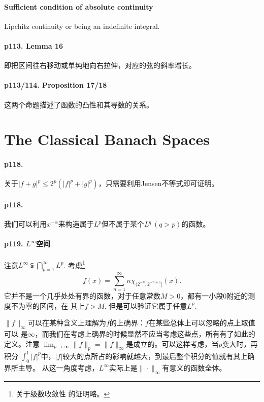   \paragraph{Sufficient condition of absolute continuity}
    Lipchitz continuity or being an indefinite integral.

  \paragraph{p113. Lemma 16}
    即把区间往右移动或单纯地向右拉伸，对应的弦的斜率增长。

  \paragraph{p113/114. Proposition 17/18}
    这两个命题描述了函数的凸性和其导数的关系。
  

\newpage
\section{The Classical Banach Spaces}
  \paragraph{p118.}
    关于$|f+g|^p\le 2^p(|f|^p+|g|^p)$，只需要利用Jensen不等式即可证明。

  \paragraph{p118.}
    我们可以利用$x^{-\alpha}$来构造属于$L^p$但不属于某个$L^q\,(q>p)$的函数。

  \paragraph{p119. $L^\infty$空间}
    注意$L^\infty\subsetneqq\bigcap_{p=1}^\infty L^p$. 考虑\footnote{关于级数收敛性
    的证明略。}
    \[
      f(x) = \sum_{n=1}^\infty n\chi_{(2^{-n}, 2^{-n+1}]}(x).
    \]
    它并不是一个几乎处处有界的函数，对于任意常数$M>0$，都有一小段$0$附近的测度不为零的区间，在
    其上$f>M$. 但是可以验证它属于任意$L^p$.\par
    $\|f\|_\infty$可以在某种含义上理解为$f$的上确界：$f$在某些总体上可以忽略的点上取值可以
    是$\infty$，而我们在考虑上确界的时候显然不应当考虑这些点，所有有了如此的定义。注意
    $\lim_{p\to\infty}\|f\|_p =\|f\|_\infty$是成立的。可以这样考虑，当$p$变大时，再积分
    $\int_0^1|f|^p$中，$|f|$较大的点所占的影响就越大，到最后整个积分的值就有其上确界所主导。
    从这一角度考虑，$L^\infty$实际上是$\|\cdot\|_\infty$有意义的函数全体。

